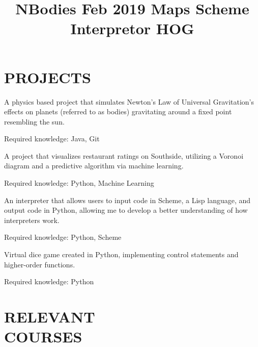 \documentclass[margin]{res}
\begin{document}
\begin{resume}
\section{PROJECTS}
\title{\textbf{NBodies \hfill Feb 2019}
 }
\begin{position}
A physics based project that simulates Newton's Law of Universal Gravitation's effects on planets (referred to as bodies) gravitating around a fixed point resembling the sun. 

Required knowledge: Java, Git
\end{position}


\title{\textbf{Maps \hfill }
 }
\begin{position}
A project that visualizes restaurant ratings on Southside, utilizing a Voronoi diagram and a predictive algorithm via machine learning. 

Required knowledge: Python, Machine Learning
\end{position}

\title{\textbf{Scheme Interpretor \hfill}
 }
\begin{position}
An interpreter that allows users to input code in Scheme, a Lisp language, and output code in Python, allowing me to develop a better understanding of how interpreters work.

Required knowledge: Python, Scheme 
\end{position}

\title{\textbf{HOG \hfill}
 }
\begin{position}
Virtual dice game created in Python, implementing control statements and higher-order functions. 

Required knowledge: Python
\end{position}


\section{RELEVANT\\COURSES}
\par


\end{resume}
\end{document}
